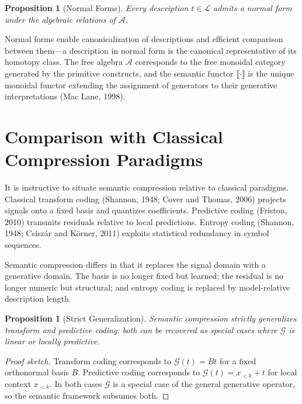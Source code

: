 \documentclass[11pt,a4paper]{article}
\newtheorem{proposition}[theorem]{Proposition}
\theoremstyle{definition}
\theoremstyle{remark}
\begin{document}
\begin{proposition}[Normal Forms]
Every description $t \in \mathcal{L}$ admits a normal form under the algebraic relations of $\mathcal{A}$.
\end{proposition}

Normal forms enable canonicalization of descriptions and efficient comparison between them---a description in normal form is the canonical representative of its homotopy class. The free algebra $\mathcal{A}$ corresponds to the free monoidal category generated by the primitive constructs, and the semantic functor $\llbracket \cdot \rrbracket$ is the unique monoidal functor extending the assignment of generators to their generative interpretations (Mac Lane, 1998).

\section{Comparison with Classical Compression Paradigms}
\label{sec:comparison}

It is instructive to situate semantic compression relative to classical paradigms. Classical transform coding (Shannon, 1948; Cover and Thomas, 2006) projects signals onto a fixed basis and quantizes coefficients. Predictive coding (Friston, 2010) transmits residuals relative to local predictions. Entropy coding (Shannon, 1948; Csisz\'{a}r and K\"{o}rner, 2011) exploits statistical redundancy in symbol sequences.

Semantic compression differs in that it replaces the signal domain with a generative domain. The basis is no longer fixed but learned; the residual is no longer numeric but structural; and entropy coding is replaced by model-relative description length.

\begin{proposition}[Strict Generalization]
Semantic compression strictly generalizes transform and predictive coding: both can be recovered as special cases where $\mathcal{G}$ is linear or locally predictive.
\end{proposition}

\begin{proof}[Proof sketch]
Transform coding corresponds to $\mathcal{G}(t) = B t$ for a fixed orthonormal basis $B$. Predictive coding corresponds to $\mathcal{G}(t) = x_{<k} + t$ for local context $x_{<k}$. In both cases $\mathcal{G}$ is a special case of the general generative operator, so the semantic framework subsumes both.
\end{proof}
\end{document}
